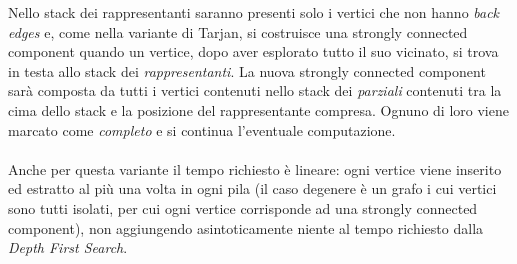 Nello stack dei rappresentanti saranno presenti solo i vertici che non
hanno \emph{back edges} e, come nella variante di Tarjan, si
costruisce una strongly connected component quando un vertice, dopo
aver esplorato tutto il suo vicinato, si trova in testa allo stack dei
\emph{rappresentanti}. La nuova strongly connected component sar\`a
composta da tutti i vertici contenuti nello stack dei \emph{parziali}
contenuti tra la cima dello stack e la posizione del rappresentante
compresa. Ognuno di loro viene marcato come \emph{completo} e si
continua l'eventuale computazione.
\\\\
Anche per questa variante il tempo richiesto \`e lineare: ogni vertice
viene inserito ed estratto al pi\`u una volta in ogni pila (il caso
degenere \`e un grafo i cui vertici sono tutti isolati, per cui ogni
vertice corrisponde ad una strongly connected component), non
aggiungendo asintoticamente niente al tempo richiesto dalla
\emph{Depth First Search}.

